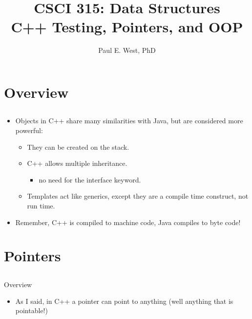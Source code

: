 \documentclass{beamer}
\title{CSCI 315: Data Structures \\ C++ Testing, Pointers, and OOP}
\author{Paul E. West, PhD}
\institute{
  Department of Computer Science\\
  Charleston Southern University
}
\begin{document}
\begin{frame}
  \titlepage
\end{frame}

\section{Overview}
\subsection{}

\begin{frame}{}
\begin{itemize}
\item Objects in C++ share many similarities with Java, but are considered more powerful:
\begin{itemize}
\item They can be created on the stack.
\item C++ allows multiple inheritance.
\begin{itemize}
\item no need for the interface keyword.
\end{itemize}
\item Templates act like generics, except they are a compile time construct, not run time.
\end{itemize}
\item Remember, C++ is compiled to machine code, Java compiles to byte code!
\end{itemize}
\end{frame}


\section{Pointers}
\subsection{}

\begin{frame}{Overview}
\begin{itemize}
\item As I said, in C++ a pointer can point to anything (well anything that is pointable!)
\end{itemize}
\end{frame}
\end{document}
